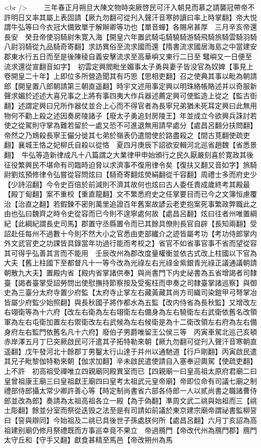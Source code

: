 <br />
　　三年春正月朔旦大陳文物時突厥啓民可汗入朝見而慕之請襲冠帶帝不許明日又率其屬上表固請【厥九勿翻可從刋入聲汗音寒帥讀曰率上時掌翻】帝大悦謂牛弘等曰今衣冠大備致單于解辮卿等功也【單音蟬】各賜帛甚厚　三月辛亥帝還長安　癸丑帝使羽騎尉朱寛入海【開皇六年置武騎屯騎驍騎游騎飛騎旅騎雲騎羽騎八尉羽騎從九品騎奇寄翻】求訪異俗至流求國而還【隋書流求國居海島之中當建安郡東水行五日而至是後陳稜自義安擊流求至高華嶼又東行二日至鼊嶼又一日便至流求還從宣翻音如字】　初雲定興閻毗坐媚事太子勇與妻子皆没官為奴婢【事見上卷開皇二十年】上即位多所營造聞其有巧思【思相吏翻】召之使典其事以毗為朝請郎【開皇置八郎朝請第三朝直遥翻】時宇文述用事定興以明珠絡帳賂述并以奇服新聲求媚於述述大喜兄事之上將有事四夷大作兵器述薦定興可使監造上從之【監古衘翻】述謂定興曰兄所作器仗並合上心而不得官者為長寧兄弟猶未死耳定興曰此無用物何不勸上殺之述因奏房陵諸子【廢太子勇追封房陵王】年並成立今欲興兵誅討若使之從駕則守掌為難若留於一處又恐不可進退無用請早處分【處昌呂翻分扶問翻】帝然之乃鴆殺長寧王儼分徙其七弟於嶺表仍遣間使於路盡殺之【間古莧翻使疏吏翻】襄城王恪之妃柳氏自殺以從恪　夏四月庚辰下詔欲安輯河北巡省趙魏【省悉景翻】　牛弘等造新律成凡十八篇謂之大業律甲申始頒行之民久厭嚴刻喜於寛政其後征役繁興民不堪命有司臨時迫脅以求濟事不復用律令矣【復扶又翻又音如字】旅騎尉劉炫預修律令弘嘗從容問炫曰【騎奇寄翻炫熒絹翻從千容翻】周禮士多而府史少【少詩沼翻】今令史百倍於前減則不濟其故何也炫曰古人委任責成歲終考其殿最【殿丁甸翻】案不重校【重直龍翻】文不繁悉府史之任掌要目而已今之文簿恒慮覆治【治直之翻】若鍜鍊不密則萬里追證百年舊案故諺云老吏抱案死事繁政弊職此之由也弘曰魏齊之時令史從容而已今則不遑寧處何故【處昌呂翻】炫曰往者州唯置綱紀【此綱紀謂長史司馬】郡置守丞縣置令而已其餘具僚則長官自辟【長知兩翻】受詔赴任每州不過數十今則不然大小之官悉由吏部纎介之迹皆屬考功【考功侍郎掌内外文武官吏之功課皆具錄當年功過行能而考校之】省官不如省事官事不省而望從容其可得乎弘善其言而不能用　壬辰改州為郡改度量權衡並依古式改上柱國以下官為大夫【舊上柱國下至都督凡十一等今改為光祿左右光祿金紫銀青光祿正議通議朝請朝散九大夫】置殿内省【殿内省掌諸供奉】與尚書門下内史祕書為五省增謁者司隸臺【謁者臺掌受詔勞問出使慰撫持節察按及受寃枉而申奏之司隸臺掌諸巡察】與御史為三臺分太府寺置少府監【太府寺止掌左右藏黃藏其尚方司織司染鎧甲弓弩掌冶皆屬少府監少始照翻】與長秋國子將作都水為五監【改内侍省為長秋監】又增改左右翊衛等為十六府【改左右衛為左右翊衛左右備身為左右驍衛左右武衛依舊名改領軍為左右屯衛加置左右禦衛改左右武候為左右候衛是為十二衛改領左右府為左右備身府左右監門依舊名凡十六府】廢伯子男爵唯留王公侯三等　丙寅車駕北巡己亥頓赤岸澤五月丁巳突厥啟民可汗遣其子拓特勒來朝【厥九勿翻可從刋入聲汗音寒朝直遥翻】戊午發河北十餘郡丁男鑿太行山達于并州以通馳道【行戶剛翻】丙寅啟民遣其兄子毗黎伽特勒來朝【伽求加翻】辛未啟民遣使請自入塞奉迎輿駕【使疏吏翻】上不許　初高祖受禪唯立四親廟同殿異室而已【四親廟一曰皇高祖太原府君廟二曰皇曾祖康王廟三曰皇祖獻王廟四曰皇考太祖武元皇帝廟】帝即位命有司議七廟之制禮部侍郎攝太常少卿許善心等【時定制尚書省六部各侍郎一人以貳尚書之職諸曹侍郎並改為郎】奏請為太祖高祖各立一殿【為于偽翻】凖周文武二祧與始祖而三【祧土彫翻】餘並分室而祭從迭毁之法至是有司請如前議於東京建宗廟帝謂祕書監柳䛒曰【䛒與辯同】今始祖及二祧已具後世子孫處朕何所【處昌呂翻】六月丁亥詔為高祖建别廟仍修月祭禮既而方事巡幸竟不果立　帝過鴈門【帝改代州為鴈門郡】鴈門太守丘和【守手又翻】獻食甚精至馬邑【帝改朔州為馬
